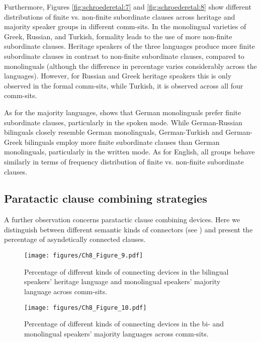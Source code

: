 \documentclass[output=paper,colorlinks,citecolor=brown]{langscibook}
\begin{document}
Furthermore, Figures \ref{fig:schroederetal:7} and \ref{fig:schroederetal:8} show different distributions of finite vs. non-finite subordinate clauses across heritage and majority speaker groups in different comm-sits. In the monolingual varieties of Greek, Russian, and Turkish, formality leads to the use of more non-finite subordinate clauses. Heritage speakers of the three languages produce more finite subordinate clauses in contrast to non-finite subordinate clauses, compared to monolinguals (although the difference in percentage varies considerably across the languages). However, for Russian and Greek heritage speakers this is only observed in the formal comm-sits, while Turkish, it is observed across all four comm-sits. 

As for the majority languages,  shows that German monolinguals prefer finite subordinate clauses, particularly in the spoken mode. While German-Russian bilinguals closely resemble German monolinguals, German-Turkish and German-Greek bilinguals employ more finite subordinate clauses than German monolinguals, particularly in the written mode. As for English, all groups behave similarly in terms of frequency distribution of finite vs. non-finite subordinate clauses.

\subsection{Paratactic clause combining strategies} \label{sec:schroederetal:3.3}

A further observation concerns paratactic clause combining devices. Here we distinguish between different semantic kinds of connectors (see ) and present the percentage of asyndetically connected clauses.

\begin{figure}
    \centering
    \texttt{[image: figures/Ch8\_Figure\_9.pdf]}
    \caption{Percentage of different kinds of connecting devices in the bilingual speakers’ heritage language and monolingual speakers’ majority language across comm-sits.}
    \label{fig:schroederetal:9}
\end{figure}

\begin{figure}
    \centering
    \texttt{[image: figures/Ch8\_Figure\_10.pdf]}
    \caption{Percentage of different kinds of connecting devices in the bi- and monolingual speakers’ majority languages across comm-sits.}
    \label{fig:schroederetal:10}
\end{figure}
\end{document}

